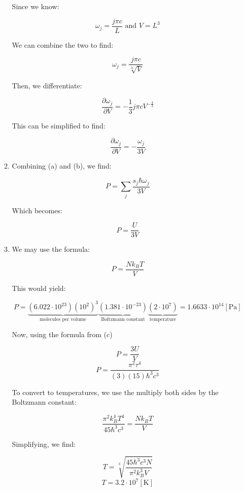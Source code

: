 \begin{enumerate}
\begin{enumerate}
        Since we know:

        $$\omega_j=\frac{j\pi c}{L}\text{ and }V=L^3$$

        We can combine the two to find:

        $$\omega_j=\frac{j\pi c}{\sqrt[3]{V}}$$

        Then, we differentiate:

        $$\frac{\partial \omega_j}{\partial V}=-\frac{1}{3}j\pi c V^{-\frac{4}{3}}$$

        This can be simplified to find:

        $$\boxed{\frac{\partial \omega_j}{\partial V}=-\frac{\omega_j}{3V}}$$

      \item 

        Combining (a) and (b), we find:

        $$P=\sum_j \frac{s_j\hbar\omega_j}{3V}$$

        Which becomes:

        $$\boxed{P=\frac{U}{3V}}$$

      \item 

        We may use the formula:

        $$P=\frac{Nk_BT}{V}$$

        This would yield:

        $$P=\underbrace{\left( 6.022\cdot 10^{23} \right)\left( 10^2 \right)^3}_{\text{molecules per volume}}\underbrace{\left( 1.381\cdot10^{-23} \right)}_{\text{Boltzmann constant}}\underbrace{\left( 2\cdot10^7 \right)}_{\text{temperature}}=1.6633\cdot10^{14}\left[ \si{\pascal} \right]$$

        Now, using the formula from (c)

        $$P=\frac{3U}{V}$$
        $$P=\frac{\pi^2\tau^4}{(3)(15)\hbar^3c^3}$$

        To convert to temperatures, we use the multiply both sides by the Boltzmann constant:

        $$\frac{\pi^2k_B^4T^4}{45\hbar^3c^3}=\frac{Nk_BT}{V}$$

        Simplifying, we find:

        $$T=\sqrt[3]{\frac{45\hbar^3c^3N}{\pi^2k_B^3V}}$$
        $$\boxed{T=3.2\cdot10^7[\si{\kelvin}]}$$

    \end{enumerate}

\end{enumerate}



